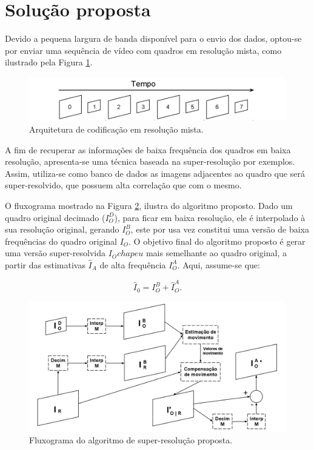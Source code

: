 \section{Solução proposta}

Devido a pequena largura de banda disponível para o envio dos dados, optou-se por enviar uma sequência de vídeo com quadros em resolução mista, como ilustrado pela Figura \ref{fig:resolucao_mista}. 

\begin{figure}[h]
	\centering
	\includegraphics[scale=0.45]{figuras/resolucao_mista.png}
	\caption{ Arquitetura de codificação em resolução mista.}

	\label{fig:resolucao_mista}
\end{figure}

A fim de recuperar as informações de baixa frequência dos quadros em baixa resolução, apresenta-se uma técnica baseada na super-resolução por exemplos. Assim, utiliza-se como banco de dados as imagens adjacentes ao quadro que será super-resolvido, que possuem alta correlação que com o mesmo.

O fluxograma mostrado na Figura \ref{fig:algoritmo_proposto}, ilustra do algoritmo proposto. Dado um quadro original  decimado ($I_O^D$),  para ficar em baixa resolução, ele é interpolado à sua resolução original,  gerando $I_O^B$, este por usa vez constitui uma versão de baixa frequências do quadro original $I_O$. O objetivo final do algoritmo proposto é gerar uma versão super-resolvida  $I_O chapeu$ mais semelhante ao quadro original, a partir das estimativas $\widehat{I}_A$ de alta frequência $I_O^A$. Aqui, assume-se que:

\begin{equation}
\widehat{I}_0 = I_O^B + \widehat{I}_O^A.
\label{eq_HF}
\end{equation}

\begin{figure}[h]
	\centering
	\includegraphics[scale=0.30]{figuras/fluxo_super_resolucao.png}
	\caption{Fluxograma do algoritmo de super-resolução proposta.}
	\label{fig:algoritmo_proposto}
\end{figure}

